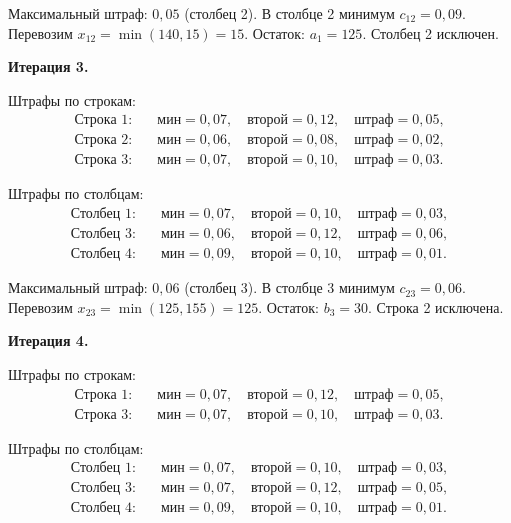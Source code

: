 \documentclass[a4paper, final]{article}
\begin{document}
Максимальный штраф: $0{,}05$ (столбец 2). В столбце 2 минимум $c_{12} = 0{,}09$.
Перевозим $x_{12} = \min(140, 15) = 15$. Остаток: $a_1 = 125$. Столбец 2 исключен.

\textbf{Итерация 3.}

Штрафы по строкам:
\begin{align*}
\text{Строка 1:} \quad &\text{мин} = 0{,}07, \quad \text{второй} = 0{,}12, \quad \text{штраф} = 0{,}05,\\
\text{Строка 2:} \quad &\text{мин} = 0{,}06, \quad \text{второй} = 0{,}08, \quad \text{штраф} = 0{,}02,\\
\text{Строка 3:} \quad &\text{мин} = 0{,}07, \quad \text{второй} = 0{,}10, \quad \text{штраф} = 0{,}03.
\end{align*}

Штрафы по столбцам:
\begin{align*}
\text{Столбец 1:} \quad &\text{мин} = 0{,}07, \quad \text{второй} = 0{,}10, \quad \text{штраф} = 0{,}03,\\
\text{Столбец 3:} \quad &\text{мин} = 0{,}06, \quad \text{второй} = 0{,}12, \quad \text{штраф} = 0{,}06,\\
\text{Столбец 4:} \quad &\text{мин} = 0{,}09, \quad \text{второй} = 0{,}10, \quad \text{штраф} = 0{,}01.
\end{align*}

Максимальный штраф: $0{,}06$ (столбец 3). В столбце 3 минимум $c_{23} = 0{,}06$.
Перевозим $x_{23} = \min(125, 155) = 125$. Остаток: $b_3 = 30$. Строка 2 исключена.

\textbf{Итерация 4.}

Штрафы по строкам:
\begin{align*}
\text{Строка 1:} \quad &\text{мин} = 0{,}07, \quad \text{второй} = 0{,}12, \quad \text{штраф} = 0{,}05,\\
\text{Строка 3:} \quad &\text{мин} = 0{,}07, \quad \text{второй} = 0{,}10, \quad \text{штраф} = 0{,}03.
\end{align*}

Штрафы по столбцам:
\begin{align*}
\text{Столбец 1:} \quad &\text{мин} = 0{,}07, \quad \text{второй} = 0{,}10, \quad \text{штраф} = 0{,}03,\\
\text{Столбец 3:} \quad &\text{мин} = 0{,}07, \quad \text{второй} = 0{,}12, \quad \text{штраф} = 0{,}05,\\
\text{Столбец 4:} \quad &\text{мин} = 0{,}09, \quad \text{второй} = 0{,}10, \quad \text{штраф} = 0{,}01.
\end{align*}
\end{document}
